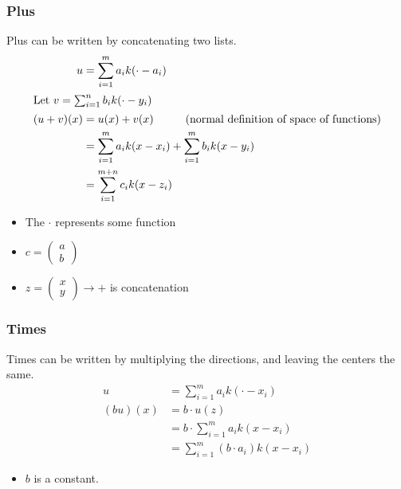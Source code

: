 \documentclass[10pt]{article}
\begin{document}
\subsubsection*{Plus}
Plus can be written by concatenating two lists.
\begin{align*}
    u &= \sum_{i = 1}^m a_i k(\cdot - a_i)\\
    \intertext{Let $v = \sum_{i = 1}^n b_i k(\cdot - y_i)$}
    (u + v)(x) &= u(x) + v(x)  \hspace{1cm} \text{(normal definition of space of functions)}\\
    &= \sum_{i = 1}^m a_i k(x - x_i) + \sum_{i = 1}^m b_i k(x - y_i)\\
    &= \sum_{i = 1}^{m + n} c_i k(x - z_i)
\end{align*}
\begin{itemize}
    \item The $\cdot$ represents some function
    \item $c = \begin{pmatrix} a \\ b \end{pmatrix}$
    \item $z = \begin{pmatrix} x \\ y \end{pmatrix} \rightarrow +$ is concatenation
\end{itemize}

\subsubsection*{Times}
Times can be written by multiplying the directions, and leaving the centers the same.
\begin{align*}
    u &= \sum_{i = 1}^m a_i k(\cdot - x_i)\\
    (b u)(x) &= b \cdot u(z)\\
    &= b \cdot \sum_{i = 1}^m a_i k(x - x_i)\\
    &= \sum_{i = 1}^m (b \cdot a_i) k(x - x_i)
\end{align*}
\begin{itemize}
    \item $b$ is a constant.
\end{itemize}
\end{document}
